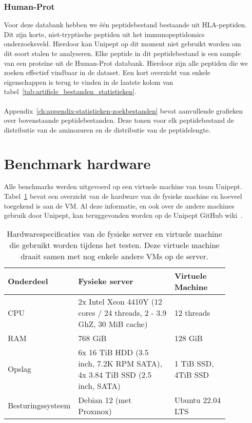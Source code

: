 \subsubsection{Human-Prot}
Voor deze databank hebben we één peptidebestand bestaande uit HLA-peptiden.
Dit zijn korte, niet-tryptische peptiden uit het immunopeptidomics onderzoeksveld.
Hierdoor kan Unipept op dit moment niet gebruikt worden om dit soort stalen te analyseren.
Elke peptide in dit peptidebestand is een sample van een proteïne uit de Human-Prot databank.
Hierdoor zijn alle peptiden die we zoeken effectief vindbaar in de dataset.
Een kort overzicht van enkele eigenschappen is terug te vinden in de laatste kolom van tabel~\ref{tab:artifiele_bestanden_statistieken}.
\\ \\
Appendix~\ref{ch:appendix-statistieken-zoekbestanden} bevat aanvullende grafieken over bovenstaande peptidebestanden.
Deze tonen voor elk peptidebestand de distributie van de aminozuren en de distributie van de peptidelengte.


\section{Benchmark hardware}\label{sec:benchmark-hardware}
Alle benchmarks werden uitgevoerd op een virtuele machine van team Unipept.
Tabel~\ref{tab:Matt_hardware} bevat een overzicht van de hardware van de fysieke machine en hoeveel toegekend is aan de VM\@.
Al deze informatie, en ook over de andere machines gebruik door Unipept, kan teruggevonden worden op de Unipept GitHub wiki~\cite{unipept_infrastructure}.

\begin{table}[h!]
    \centering
    \begin{tabular}{p{0.20\linewidth}p{0.45\linewidth}p{0.25\linewidth}}
        Onderdeel         & Fysieke server                                                            & Virtuele Machine    \\
        \hline\hline
        CPU               & 2x Intel Xeon 4410Y (12 cores / 24 threads, 2 - 3.9 GhZ, 30 MiB cache)    & 12 threads          \\
        RAM               & 768 GiB                                                                   & 128 GiB             \\
        Opslag            & 6x 16 TiB HDD (3.5 inch, 7.2K RPM SATA), 4x 3.84 TiB SSD (2.5 inch, SATA) & 1 TiB SSD, 4TiB SSD \\
        Besturingssysteem & Debian 12 (met Proxmox)                                                   & Ubuntu 22.04 LTS    \\
        \hline
    \end{tabular}
    \caption{Hardwarespecificaties van de fysieke server en virtuele machine die gebruikt worden tijdens het testen. Deze virtuele machine draait samen met nog enkele andere VMs op de server.}
    \label{tab:Matt_hardware}
\end{table}
